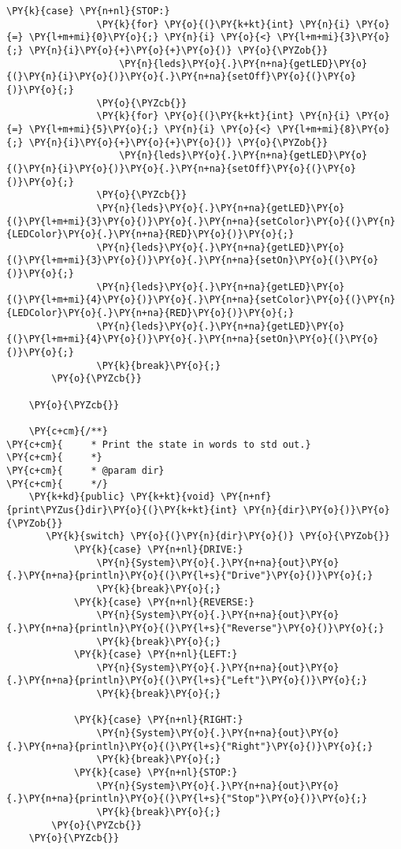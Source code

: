 \begin{Verbatim}[commandchars=\\\{\}]
            \PY{k}{case} \PY{n+nl}{STOP:}
                \PY{k}{for} \PY{o}{(}\PY{k+kt}{int} \PY{n}{i} \PY{o}{=} \PY{l+m+mi}{0}\PY{o}{;} \PY{n}{i} \PY{o}{<} \PY{l+m+mi}{3}\PY{o}{;} \PY{n}{i}\PY{o}{+}\PY{o}{+}\PY{o}{)} \PY{o}{\PYZob{}}
                    \PY{n}{leds}\PY{o}{.}\PY{n+na}{getLED}\PY{o}{(}\PY{n}{i}\PY{o}{)}\PY{o}{.}\PY{n+na}{setOff}\PY{o}{(}\PY{o}{)}\PY{o}{;}
                \PY{o}{\PYZcb{}}
                \PY{k}{for} \PY{o}{(}\PY{k+kt}{int} \PY{n}{i} \PY{o}{=} \PY{l+m+mi}{5}\PY{o}{;} \PY{n}{i} \PY{o}{<} \PY{l+m+mi}{8}\PY{o}{;} \PY{n}{i}\PY{o}{+}\PY{o}{+}\PY{o}{)} \PY{o}{\PYZob{}}
                    \PY{n}{leds}\PY{o}{.}\PY{n+na}{getLED}\PY{o}{(}\PY{n}{i}\PY{o}{)}\PY{o}{.}\PY{n+na}{setOff}\PY{o}{(}\PY{o}{)}\PY{o}{;}
                \PY{o}{\PYZcb{}}
                \PY{n}{leds}\PY{o}{.}\PY{n+na}{getLED}\PY{o}{(}\PY{l+m+mi}{3}\PY{o}{)}\PY{o}{.}\PY{n+na}{setColor}\PY{o}{(}\PY{n}{LEDColor}\PY{o}{.}\PY{n+na}{RED}\PY{o}{)}\PY{o}{;}
                \PY{n}{leds}\PY{o}{.}\PY{n+na}{getLED}\PY{o}{(}\PY{l+m+mi}{3}\PY{o}{)}\PY{o}{.}\PY{n+na}{setOn}\PY{o}{(}\PY{o}{)}\PY{o}{;}
                \PY{n}{leds}\PY{o}{.}\PY{n+na}{getLED}\PY{o}{(}\PY{l+m+mi}{4}\PY{o}{)}\PY{o}{.}\PY{n+na}{setColor}\PY{o}{(}\PY{n}{LEDColor}\PY{o}{.}\PY{n+na}{RED}\PY{o}{)}\PY{o}{;}
                \PY{n}{leds}\PY{o}{.}\PY{n+na}{getLED}\PY{o}{(}\PY{l+m+mi}{4}\PY{o}{)}\PY{o}{.}\PY{n+na}{setOn}\PY{o}{(}\PY{o}{)}\PY{o}{;}
                \PY{k}{break}\PY{o}{;}
        \PY{o}{\PYZcb{}}

    \PY{o}{\PYZcb{}}

    \PY{c+cm}{/**}
\PY{c+cm}{     * Print the state in words to std out.}
\PY{c+cm}{     *}
\PY{c+cm}{     * @param dir}
\PY{c+cm}{     */}
    \PY{k+kd}{public} \PY{k+kt}{void} \PY{n+nf}{print\PYZus{}dir}\PY{o}{(}\PY{k+kt}{int} \PY{n}{dir}\PY{o}{)}\PY{o}{\PYZob{}}
       \PY{k}{switch} \PY{o}{(}\PY{n}{dir}\PY{o}{)} \PY{o}{\PYZob{}}
            \PY{k}{case} \PY{n+nl}{DRIVE:}
                \PY{n}{System}\PY{o}{.}\PY{n+na}{out}\PY{o}{.}\PY{n+na}{println}\PY{o}{(}\PY{l+s}{"Drive"}\PY{o}{)}\PY{o}{;}
                \PY{k}{break}\PY{o}{;}
            \PY{k}{case} \PY{n+nl}{REVERSE:}
                \PY{n}{System}\PY{o}{.}\PY{n+na}{out}\PY{o}{.}\PY{n+na}{println}\PY{o}{(}\PY{l+s}{"Reverse"}\PY{o}{)}\PY{o}{;}
                \PY{k}{break}\PY{o}{;}
            \PY{k}{case} \PY{n+nl}{LEFT:}
                \PY{n}{System}\PY{o}{.}\PY{n+na}{out}\PY{o}{.}\PY{n+na}{println}\PY{o}{(}\PY{l+s}{"Left"}\PY{o}{)}\PY{o}{;}
                \PY{k}{break}\PY{o}{;}

            \PY{k}{case} \PY{n+nl}{RIGHT:}
                \PY{n}{System}\PY{o}{.}\PY{n+na}{out}\PY{o}{.}\PY{n+na}{println}\PY{o}{(}\PY{l+s}{"Right"}\PY{o}{)}\PY{o}{;}
                \PY{k}{break}\PY{o}{;}
            \PY{k}{case} \PY{n+nl}{STOP:}
                \PY{n}{System}\PY{o}{.}\PY{n+na}{out}\PY{o}{.}\PY{n+na}{println}\PY{o}{(}\PY{l+s}{"Stop"}\PY{o}{)}\PY{o}{;}
                \PY{k}{break}\PY{o}{;}
        \PY{o}{\PYZcb{}}
    \PY{o}{\PYZcb{}}


\end{Verbatim}
